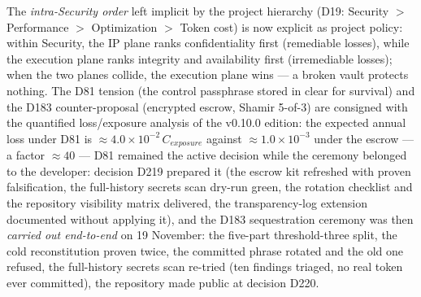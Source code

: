 \documentclass[10pt,a4paper]{article}
\begin{document}
The \emph{intra-Security order} left implicit by the project hierarchy
(D19: Security $>$ Performance $>$ Optimization $>$ Token cost) is now
explicit as project policy: within Security, the IP plane ranks
confidentiality first (remediable losses), while the execution plane
ranks integrity and availability first (irremediable losses); when the
two planes collide, the execution plane wins --- a broken vault protects
nothing. The D81 tension (the control passphrase stored in clear for
survival) and the D183 counter-proposal (encrypted escrow, Shamir
5-of-3) are consigned with the quantified loss/exposure analysis of the
v0.10.0 edition: the expected annual loss under D81 is
$\approx 4.0 \times 10^{-2}\,C_{exposure}$ against
$\approx 1.0 \times 10^{-3}$ under the escrow --- a factor $\approx 40$
--- D81 remained the active decision while the ceremony belonged to
the developer: decision D219 prepared it (the escrow kit refreshed
with proven falsification, the full-history secrets scan dry-run
green, the rotation checklist and the repository visibility matrix
delivered, the transparency-log extension documented without applying
it), and the D183 sequestration ceremony was then \emph{carried out
end-to-end} on 19 November: the five-part threshold-three split, the
cold reconstitution proven twice, the committed phrase rotated and the
old one refused, the full-history secrets scan re-tried (ten findings
triaged, no real token ever committed), the repository made public at
decision D220.
\end{document}
